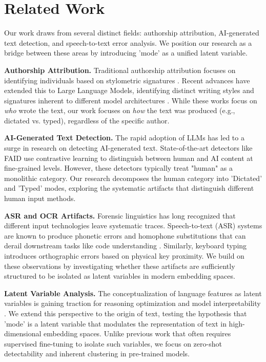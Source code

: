 \section{Related Work}
\label{sec:related}

Our work draws from several distinct fields: authorship attribution, AI-generated text detection, and speech-to-text error analysis. We position our research as a bridge between these areas by introducing 'mode' as a unified latent variable.

{\bf Authorship Attribution.}
Traditional authorship attribution focuses on identifying individuals based on stylometric signatures \cite{kumarage2023neural}.
Recent advances have extended this to Large Language Models, identifying distinct writing styles and signatures inherent to different model architectures \cite{huang2024authorship}.
While these works focus on {\it who} wrote the text, our work focuses on {\it how} the text was produced (e.g., dictated vs. typed), regardless of the specific author.

{\bf AI-Generated Text Detection.}
The rapid adoption of LLMs has led to a surge in research on detecting AI-generated text.
State-of-the-art detectors like FAID \cite{ta2025faid} use contrastive learning to distinguish between human and AI content at fine-grained levels.
However, these detectors typically treat "human" as a monolithic category.
Our research decomposes the human category into 'Dictated' and 'Typed' modes, exploring the systematic artifacts that distinguish different human input methods.

{\bf ASR and OCR Artifacts.}
Forensic linguistics has long recognized that different input technologies leave systematic traces.
Speech-to-text (ASR) systems are known to produce phonetic errors and homophone substitutions that can derail downstream tasks like code understanding \cite{havare2026lost}.
Similarly, keyboard typing introduces orthographic errors based on physical key proximity.
We build on these observations by investigating whether these artifacts are sufficiently structured to be isolated as latent variables in modern embedding spaces.

{\bf Latent Variable Analysis.}
The conceptualization of language features as latent variables is gaining traction for reasoning optimization and model interpretability \cite{wu2026language}.
We extend this perspective to the origin of text, testing the hypothesis that 'mode' is a latent variable that modulates the representation of text in high-dimensional embedding spaces.
Unlike previous work that often requires supervised fine-tuning to isolate such variables, we focus on zero-shot detectability and inherent clustering in pre-trained models.
